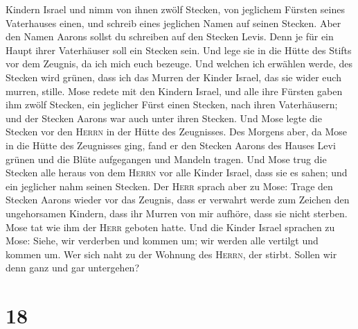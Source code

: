 Kindern Israel und nimm von ihnen zwölf Stecken, von jeglichem Fürsten
seines Vaterhauses einen, und schreib eines jeglichen Namen auf seinen
Stecken.  Aber den Namen Aarons sollst du schreiben auf
den Stecken Levis. Denn je für ein Haupt ihrer Vaterhäuser soll ein
Stecken sein.  Und lege sie in die Hütte des Stifts vor
dem Zeugnis, da ich mich euch bezeuge.  Und welchen ich
erwählen werde, des Stecken wird grünen, dass ich das Murren der Kinder
Israel, das sie wider euch murren, stille.  Mose redete
mit den Kindern Israel, und alle ihre Fürsten gaben ihm zwölf Stecken,
ein jeglicher Fürst einen Stecken, nach ihren Vaterhäusern; und der
Stecken Aarons war auch unter ihren Stecken.  Und Mose
legte die Stecken vor den \textsc{Herrn} in der Hütte des Zeugnisses.
 Des Morgens aber, da Mose in die Hütte des Zeugnisses
ging, fand er den Stecken Aarons des Hauses Levi grünen und die Blüte
aufgegangen und Mandeln tragen.  Und Mose trug die
Stecken alle heraus von dem \textsc{Herrn} vor alle Kinder Israel, dass
sie es sahen; und ein jeglicher nahm seinen Stecken.  Der
\textsc{Herr} sprach aber zu Mose: Trage den Stecken Aarons wieder vor
das Zeugnis, dass er verwahrt werde zum Zeichen den ungehorsamen
Kindern, dass ihr Murren von mir aufhöre, dass sie nicht sterben.
 Mose tat wie ihm der \textsc{Herr} geboten hatte.
 Und die Kinder Israel sprachen zu Mose: Siehe, wir
verderben und kommen um; wir werden alle vertilgt und kommen um.
 Wer sich naht zu der Wohnung des \textsc{Herrn}, der
stirbt. Sollen wir denn ganz und gar untergehen?

\hypertarget{section-17}{%
\section{18}\label{section-17}}

